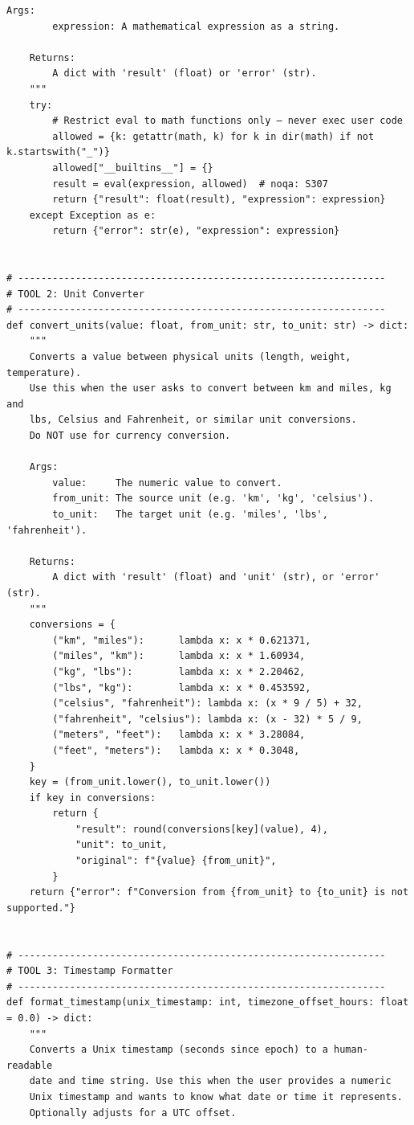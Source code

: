 \documentclass[12pt, a4paper]{article}
\begin{document}
\begin{practicalbox}
\begin{lstlisting}[style=pythonstyle, caption={tools.py --- three custom tools with typed schemas}]
    Args:
        expression: A mathematical expression as a string.

    Returns:
        A dict with 'result' (float) or 'error' (str).
    """
    try:
        # Restrict eval to math functions only — never exec user code
        allowed = {k: getattr(math, k) for k in dir(math) if not k.startswith("_")}
        allowed["__builtins__"] = {}
        result = eval(expression, allowed)  # noqa: S307
        return {"result": float(result), "expression": expression}
    except Exception as e:
        return {"error": str(e), "expression": expression}


# ----------------------------------------------------------------
# TOOL 2: Unit Converter
# ----------------------------------------------------------------
def convert_units(value: float, from_unit: str, to_unit: str) -> dict:
    """
    Converts a value between physical units (length, weight, temperature).
    Use this when the user asks to convert between km and miles, kg and
    lbs, Celsius and Fahrenheit, or similar unit conversions.
    Do NOT use for currency conversion.

    Args:
        value:     The numeric value to convert.
        from_unit: The source unit (e.g. 'km', 'kg', 'celsius').
        to_unit:   The target unit (e.g. 'miles', 'lbs', 'fahrenheit').

    Returns:
        A dict with 'result' (float) and 'unit' (str), or 'error' (str).
    """
    conversions = {
        ("km", "miles"):      lambda x: x * 0.621371,
        ("miles", "km"):      lambda x: x * 1.60934,
        ("kg", "lbs"):        lambda x: x * 2.20462,
        ("lbs", "kg"):        lambda x: x * 0.453592,
        ("celsius", "fahrenheit"): lambda x: (x * 9 / 5) + 32,
        ("fahrenheit", "celsius"): lambda x: (x - 32) * 5 / 9,
        ("meters", "feet"):   lambda x: x * 3.28084,
        ("feet", "meters"):   lambda x: x * 0.3048,
    }
    key = (from_unit.lower(), to_unit.lower())
    if key in conversions:
        return {
            "result": round(conversions[key](value), 4),
            "unit": to_unit,
            "original": f"{value} {from_unit}",
        }
    return {"error": f"Conversion from {from_unit} to {to_unit} is not supported."}


# ----------------------------------------------------------------
# TOOL 3: Timestamp Formatter
# ----------------------------------------------------------------
def format_timestamp(unix_timestamp: int, timezone_offset_hours: float = 0.0) -> dict:
    """
    Converts a Unix timestamp (seconds since epoch) to a human-readable
    date and time string. Use this when the user provides a numeric
    Unix timestamp and wants to know what date or time it represents.
    Optionally adjusts for a UTC offset.


\end{lstlisting}
\end{practicalbox}
\end{document}
